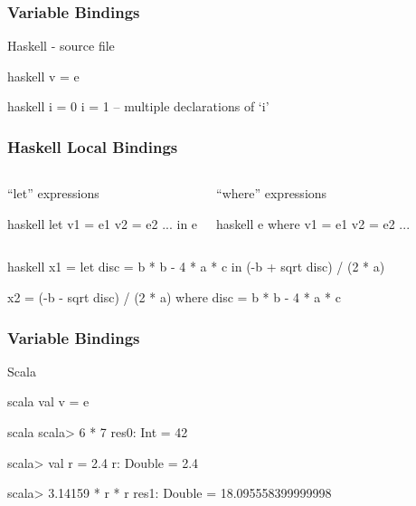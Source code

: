 \documentclass[dvipsnames]{beamer}
\theoremstyle{plain}
\begin{document}
\begin{frame}[fragile]
  \frametitle{Variable Bindings}

  \begin{block}{Haskell - source file}
    \begin{pygments}{haskell}
v = e
    \end{pygments}
  \end{block}

  \begin{example}
    \begin{pygments}{haskell}
i = 0
i = 1   -- multiple declarations of `i'
    \end{pygments}
  \end{example}
\end{frame}

\begin{frame}[fragile]
  \frametitle{Haskell Local Bindings}

  \begin{columns}[t]
    \begin{block}{``let'' expressions}
      \begin{pygments}{haskell}
let v1 = e1
    v2 = e2
    ...
in
    e
      \end{pygments}
    \end{block}

    \pause
    \begin{block}{``where'' expressions}
      \begin{pygments}{haskell}
e
where v1 = e1
      v2 = e2
      ...
      \end{pygments}
    \end{block}
  \end{columns}

  \begin{example}
    \begin{pygments}{haskell}
x1 = let disc = b * b - 4 * a * c
     in (-b + sqrt disc) / (2 * a)

x2 = (-b - sqrt disc) / (2 * a)
     where disc = b * b - 4 * a * c
    \end{pygments}
  \end{example}
\end{frame}

\begin{frame}[fragile]
  \frametitle{Variable Bindings}

  \begin{block}{Scala}
    \begin{pygments}{scala}
val v = e
    \end{pygments}
  \end{block}

  \begin{example}
    \begin{pygments}{scala}
scala> 6 * 7
res0: Int = 42

scala> val r = 2.4
r: Double = 2.4

scala> 3.14159 * r * r
res1: Double = 18.095558399999998
    \end{pygments}
  \end{example}
\end{frame}
\end{document}
